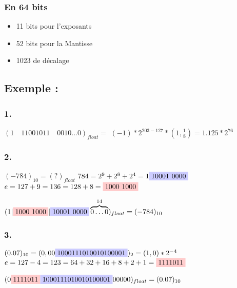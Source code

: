 \documentclass[12pt]{article}
\begin{document}
\subsubsection*{En 64 bits}
    \begin{itemize}
        \item 11 bits pour l'exposants
        \item 52 bits pour la Mantisse
        \item 1023 de décalage
\end{itemize}

\subsection*{Exemple : }

\subsubsection*{1.} 
$(1 \quad 11001011 \quad 0010...0)_{float} = $
$(-1)*2^{203-127} * (1,\frac{1}{8}) = 1.125 * 2^{76}$

\subsubsection*{2.}
$(-784)_{10} = (?)_{float}$
$784 = 2^{9}+2^{8}+2^{4} = 1 \colorbox{blue!20}{10001 0000} $\\
$ e = 127 + 9 = 136 = 128 + 8 =  \colorbox{red!20}{1000 1000}$ 

$(1 | \colorbox{red!20}{1000 1000} | \colorbox{blue!20}{10001 0000} \overbrace{0 \dots 0}^{14})_{float} = (-784)_{10}$

\subsubsection*{3.}
$(0.07)_{10} = (0,00\colorbox{blue!20}{1000111010010100001})_2 = (1,0)*2^{-4}$ \\
$e = 127 -4 = 123 = 64 + 32 + 16 + 8 + 2 + 1 = \colorbox{red!20}{1111011}$

$(0 \colorbox{red!20}{1111011} \colorbox{blue!20}{1000111010010100001}00000)_{float}= (0.07)_{10}$ 
\end{document}
